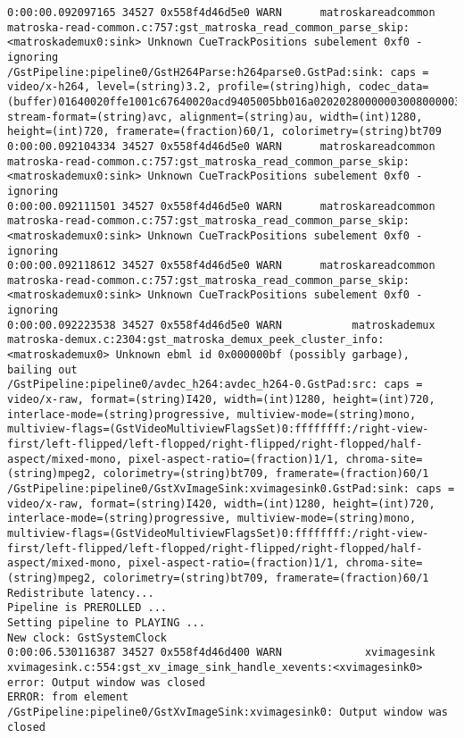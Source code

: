\documentclass[12pt,oneside]{book}
\begin{document}
\begin{lstlisting}
0:00:00.092097165 34527 0x558f4d46d5e0 WARN      matroskareadcommon matroska-read-common.c:757:gst_matroska_read_common_parse_skip:<matroskademux0:sink> Unknown CueTrackPositions subelement 0xf0 - ignoring
/GstPipeline:pipeline0/GstH264Parse:h264parse0.GstPad:sink: caps = video/x-h264, level=(string)3.2, profile=(string)high, codec_data=(buffer)01640020ffe1001c67640020acd9405005bb016a02020280000003008000003c478c18cb01000568ef85f2c0, stream-format=(string)avc, alignment=(string)au, width=(int)1280, height=(int)720, framerate=(fraction)60/1, colorimetry=(string)bt709
0:00:00.092104334 34527 0x558f4d46d5e0 WARN      matroskareadcommon matroska-read-common.c:757:gst_matroska_read_common_parse_skip:<matroskademux0:sink> Unknown CueTrackPositions subelement 0xf0 - ignoring
0:00:00.092111501 34527 0x558f4d46d5e0 WARN      matroskareadcommon matroska-read-common.c:757:gst_matroska_read_common_parse_skip:<matroskademux0:sink> Unknown CueTrackPositions subelement 0xf0 - ignoring
0:00:00.092118612 34527 0x558f4d46d5e0 WARN      matroskareadcommon matroska-read-common.c:757:gst_matroska_read_common_parse_skip:<matroskademux0:sink> Unknown CueTrackPositions subelement 0xf0 - ignoring
0:00:00.092223538 34527 0x558f4d46d5e0 WARN           matroskademux matroska-demux.c:2304:gst_matroska_demux_peek_cluster_info:<matroskademux0> Unknown ebml id 0x000000bf (possibly garbage), bailing out
/GstPipeline:pipeline0/avdec_h264:avdec_h264-0.GstPad:src: caps = video/x-raw, format=(string)I420, width=(int)1280, height=(int)720, interlace-mode=(string)progressive, multiview-mode=(string)mono, multiview-flags=(GstVideoMultiviewFlagsSet)0:ffffffff:/right-view-first/left-flipped/left-flopped/right-flipped/right-flopped/half-aspect/mixed-mono, pixel-aspect-ratio=(fraction)1/1, chroma-site=(string)mpeg2, colorimetry=(string)bt709, framerate=(fraction)60/1
/GstPipeline:pipeline0/GstXvImageSink:xvimagesink0.GstPad:sink: caps = video/x-raw, format=(string)I420, width=(int)1280, height=(int)720, interlace-mode=(string)progressive, multiview-mode=(string)mono, multiview-flags=(GstVideoMultiviewFlagsSet)0:ffffffff:/right-view-first/left-flipped/left-flopped/right-flipped/right-flopped/half-aspect/mixed-mono, pixel-aspect-ratio=(fraction)1/1, chroma-site=(string)mpeg2, colorimetry=(string)bt709, framerate=(fraction)60/1
Redistribute latency...
Pipeline is PREROLLED ...
Setting pipeline to PLAYING ...
New clock: GstSystemClock
0:00:06.530116387 34527 0x558f4d46d400 WARN             xvimagesink xvimagesink.c:554:gst_xv_image_sink_handle_xevents:<xvimagesink0> error: Output window was closed
ERROR: from element /GstPipeline:pipeline0/GstXvImageSink:xvimagesink0: Output window was closed

\end{lstlisting}
\end{document}
